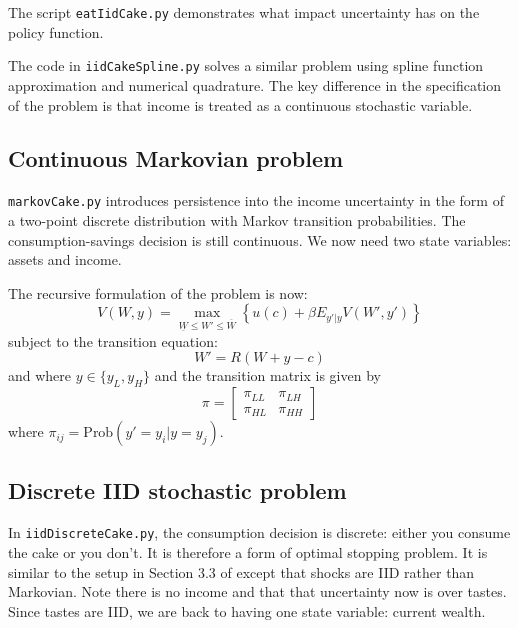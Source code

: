 The script \texttt{eatIidCake.py} demonstrates what impact uncertainty has on the policy function.

The code in \texttt{iidCakeSpline.py} solves a similar problem using spline function approximation and numerical quadrature. The key difference in the specification of the problem is that income is treated as a continuous stochastic variable.


\subsection{Continuous Markovian problem}

\texttt{markovCake.py} introduces persistence into the income uncertainty in the form of a two-point discrete distribution with Markov transition probabilities. The consumption-savings decision is still continuous. We now need two state variables: assets and income.

The recursive formulation of the problem is now:
\begin{equation}
	V(W, y) = \max_{\underline{W} \leq W' \leq \overline{W}} \left\{ u(c) + \beta E_{y' | y} V(W', y') \right\}
\end{equation}
subject to the transition equation:
\begin{equation}
	W' = R (W + y - c)
\end{equation}
and where \(y \in \{y_L, y_H\}\) and the transition matrix is given by
\begin{equation}
	\pi = 
	\left[
	\begin{matrix}
		\pi_{LL} & \pi_{LH} \\
		\pi_{HL} & \pi_{HH}
	\end{matrix}
	\right]
\end{equation}
where \(\pi_{ij} = \text{Prob}(y' = y_i | y = y_j)\).

\subsection{Discrete IID stochastic problem}

In \texttt{iidDiscreteCake.py}, the consumption decision is discrete: either you consume the cake or you don't. It is therefore a form of optimal stopping problem. It is similar to the setup in Section 3.3 of \citet{adda2003dynamic} except that shocks are IID rather than Markovian. Note there is no income and that that uncertainty now is over tastes. Since tastes are IID, we are back to having one state variable: current wealth.

